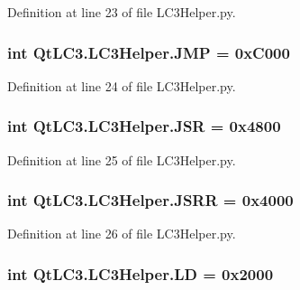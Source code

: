 Definition at line 23 of file L\-C3\-Helper.\-py.

\hypertarget{namespace_qt_l_c3_1_1_l_c3_helper_a9cfcb139adf16a156aa0e870bfc85a7d}{
\subsubsection[{J\-M\-P}]{\setlength{\rightskip}{0pt plus 5cm}int Qt\-L\-C3.\-L\-C3\-Helper.\-J\-M\-P = 0x\-C000}}\label{namespace_qt_l_c3_1_1_l_c3_helper_a9cfcb139adf16a156aa0e870bfc85a7d}


Definition at line 24 of file L\-C3\-Helper.\-py.

\hypertarget{namespace_qt_l_c3_1_1_l_c3_helper_a152d613276c3ea907e432835077675e4}{
\subsubsection[{J\-S\-R}]{\setlength{\rightskip}{0pt plus 5cm}int Qt\-L\-C3.\-L\-C3\-Helper.\-J\-S\-R = 0x4800}}\label{namespace_qt_l_c3_1_1_l_c3_helper_a152d613276c3ea907e432835077675e4}


Definition at line 25 of file L\-C3\-Helper.\-py.

\hypertarget{namespace_qt_l_c3_1_1_l_c3_helper_abf6d27ff681f7adc316c548fd3c3ef01}{
\subsubsection[{J\-S\-R\-R}]{\setlength{\rightskip}{0pt plus 5cm}int Qt\-L\-C3.\-L\-C3\-Helper.\-J\-S\-R\-R = 0x4000}}\label{namespace_qt_l_c3_1_1_l_c3_helper_abf6d27ff681f7adc316c548fd3c3ef01}


Definition at line 26 of file L\-C3\-Helper.\-py.

\hypertarget{namespace_qt_l_c3_1_1_l_c3_helper_a967020a01ae6b98a4730fe11bf09b508}{
\subsubsection[{L\-D}]{\setlength{\rightskip}{0pt plus 5cm}int Qt\-L\-C3.\-L\-C3\-Helper.\-L\-D = 0x2000}}\label{namespace_qt_l_c3_1_1_l_c3_helper_a967020a01ae6b98a4730fe11bf09b508}


